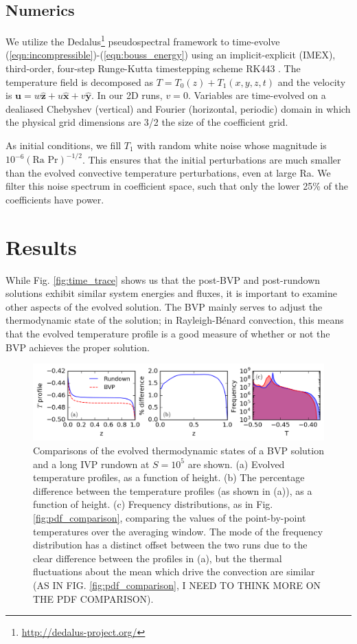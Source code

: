 \documentclass[aps, pre, onecolumn, nofootinbib, notitlepage, groupedaddress, amsfonts, amssymb, amsmath, longbibliography]{revtex4-1}
\newcommand{\RB}{Rayleigh-B\'{e}nard }
\begin{document}
\subsection{Numerics}
We utilize the 
Dedalus\footnote{\url{http://dedalus-project.org/}} 
pseudospectral framework \cite{burns&all2016} to time-evolve  
(\ref{eqn:incompressible})-(\ref{eqn:bouss_energy}) 
using an implicit-explicit (IMEX), third-order, four-step 
Runge-Kutta timestepping scheme RK443 \cite{ascher&all1997}.  
The temperature field is decomposed as $T = T_0(z) + T_1(x, y, z, t)$
and the velocity is $\bm{u} = w\bm{\hat{z}} + u\bm{\hat{x}} + v\bm{\hat{y}}$.
In our 2D runs, $v = 0$.
Variables are time-evolved on a dealiased Chebyshev (vertical)
and Fourier (horizontal, periodic) domain in which the
physical grid dimensions are 3/2 the size of the coefficient grid.  

As initial conditions, we fill $T_1$ with
random white noise whose magnitude is $10^{-6}(\text{Ra Pr})^{-1/2}$.
This ensures that the initial perturbations are much smaller than the
evolved convective temperature perturbations, even at large Ra.
We filter this noise spectrum in coefficient space, 
such that only the lower 25\% of the coefficients
have power.

\section{Results}
While Fig. \ref{fig:time_trace} shows us that the post-BVP and post-rundown solutions
exhibit similar system energies and fluxes, it is important to examine other aspects of
the evolved solution. The BVP mainly serves to adjust the thermodynamic state of the solution;
in \RB convection, this means that the evolved temperature profile is a good measure of whether
or not the BVP achieves the proper solution.

\begin{figure}[t]
\includegraphics[width=\textwidth]{./figs/temp_comparison.png}
\caption{Comparisons of the evolved thermodynamic states of a BVP solution and a long IVP rundown at
$S = 10^5$ are shown.  (a) Evolved temperature profiles, as a function of height.
(b) The percentage difference between the temperature profiles (as shown in (a)), as a function of height.
(c) Frequency distributions, as in Fig. \ref{fig:pdf_comparison},
comparing the values of the point-by-point temperatures over the averaging
window. The mode of the frequency distribution has a distinct offset between the two runs due to
the clear difference between the profiles in (a), but the
thermal fluctuations about the mean which drive the convection are similar (AS IN FIG. \ref{fig:pdf_comparison},
I NEED TO THINK MORE ON THE PDF COMPARISON).
\label{fig:temp_comparison} }
\end{figure}
\end{document}
